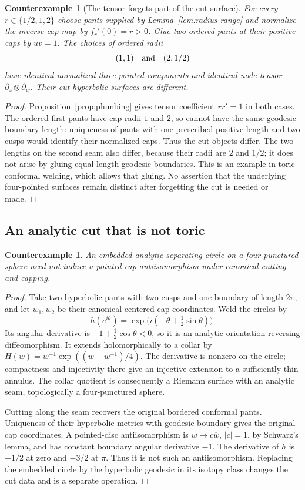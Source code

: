 \documentclass[11pt,a4paper]{article}
\newtheorem{counterexample}[theorem]{Counterexample}
\theoremstyle{definition}
\begin{document}
\begin{counterexample}[The tensor forgets part of the cut surface]\label{ex:toric}
For every $r\in\{1/2,1,2\}$ choose pants supplied by Lemma~\ref{lem:radius-range} and normalize the inverse cap map by $f_r'(0)=r>0$. Glue two ordered pants at their positive caps by $uv=1$. The choices of ordered radii
\[
 (1,1)\quad\hbox{and}\quad(2,1/2)
\]
have identical normalized three-pointed components and identical node tensor $\partial_z\otimes\partial_w$. Their cut hyperbolic surfaces are different.
\end{counterexample}
\begin{proof}
Proposition~\ref{prop:plumbing} gives tensor coefficient $rr'=1$ in both cases. The ordered first pants have cap radii $1$ and $2$, so cannot have the same geodesic boundary length: uniqueness of pants with one prescribed positive length and two cusps would identify their normalized caps. Thus the cut objects differ. The two lengths on the second seam also differ, because their radii are $2$ and $1/2$; it does not arise by gluing equal-length geodesic boundaries. This is an example in toric conformal welding, which allows that gluing. No assertion that the underlying four-pointed surfaces remain distinct after forgetting the cut is needed or made.
\end{proof}

\subsection{An analytic cut that is not toric}
\begin{counterexample}\label{ex:nontoric}
An embedded analytic separating circle on a four-punctured sphere need not induce a pointed-cap antiisomorphism under canonical cutting and capping.
\end{counterexample}
\begin{proof}
Take two hyperbolic pants with two cusps and one boundary of length $2\pi$, and let $w_1,w_2$ be their canonical centered cap coordinates. Weld the circles by
\[
 h(e^{i\theta})=\exp\bigl(i(-\theta+\tfrac12\sin\theta)\bigr).
\]
Its angular derivative is $-1+\tfrac12\cos\theta<0$, so it is an analytic orientation-reversing diffeomorphism. It extends holomorphically to a collar by
$H(w)=w^{-1}\exp((w-w^{-1})/4)$.
The derivative is nonzero on the circle; compactness and injectivity there give an injective extension to a sufficiently thin annulus. The collar quotient is consequently a Riemann surface with an analytic seam, topologically a four-punctured sphere.

Cutting along the seam recovers the original bordered conformal pants. Uniqueness of their hyperbolic metrics with geodesic boundary gives the original cap coordinates. A pointed-disc antiisomorphism is $w\mapsto c\overline w$, $|c|=1$, by Schwarz's lemma, and has constant boundary angular derivative $-1$. The derivative of $h$ is $-1/2$ at zero and $-3/2$ at $\pi$. Thus it is not such an antiisomorphism. Replacing the embedded circle by the hyperbolic geodesic in its isotopy class changes the cut data and is a separate operation.
\end{proof}
\end{document}
